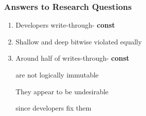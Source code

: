 \documentclass[aspectratio=43]{beamer}
\newcommand{\const}{{\color{blue} \bfseries \ttfamily const}}
\begin{document}
  \begin{frame}
    \frametitle{Answers to Research Questions}
    \large
    \begin{enumerate}
      \setlength\itemsep{0.5em}
      \item Developers write-through-\const{}
      \item Shallow and deep bitwise violated equally
      \item Around half of writes-through-\const{}

            are not logically immutable

            \vspace{2em}
            They appear to be undesirable

since developers fix them

    \end{enumerate}
  \end{frame}
\end{document}
